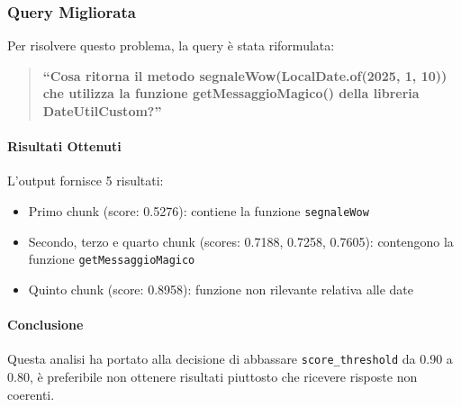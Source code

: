 \documentclass[12pt,a4paper,openright,twoside]{book}
\begin{document}
    \subsubsection{Query Migliorata}
    Per risolvere questo problema, la query è stata riformulata:
    \begin{quote}
        \textbf{``Cosa ritorna il metodo segnaleWow(LocalDate.of(2025, 1, 10)) che utilizza la funzione getMessaggioMagico() della libreria DateUtilCustom?''}
    \end{quote}

    \paragraph{Risultati Ottenuti}
    L'output fornisce 5 risultati:
    \begin{itemize}
        \item Primo chunk (score: 0.5276): contiene la funzione \texttt{segnaleWow}
        \item Secondo, terzo e quarto chunk (scores: 0.7188, 0.7258, 0.7605): contengono la funzione \texttt{getMessaggioMagico}
        \item Quinto chunk (score: 0.8958): funzione non rilevante relativa alle date
    \end{itemize}

    \paragraph{Conclusione}
    Questa analisi ha portato alla decisione di abbassare \texttt{score\_threshold} da 0.90 a 0.80,
    è preferibile non ottenere risultati piuttosto che ricevere risposte non coerenti.
    
\end{document}
